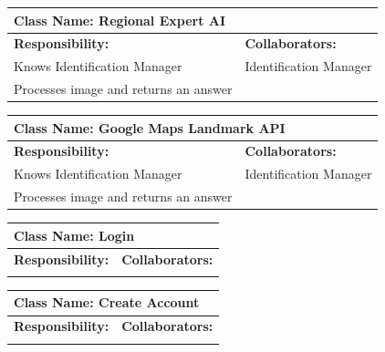 \documentclass[]{article}
\begin{document}
\begin{itemize}
	\begin{table}
		\centering
		\begin{tabular}{|p{8cm}|p{8cm}|}
		\hline 
		 \multicolumn{2}{|l|}{\textbf{Class Name:} Regional Expert AI} \\
		\hline
		\textbf{Responsibility:} & \textbf{Collaborators:} \\
		\hline
            Knows Identification Manager & Identification Manager \\
            Processes image and returns an answer
		\vspace{1cm} & \\
		\hline
		\end{tabular}
	\end{table}

	\begin{table}
		\centering
		\begin{tabular}{|p{8cm}|p{8cm}|}
		\hline 
		 \multicolumn{2}{|l|}{\textbf{Class Name:} Google Maps Landmark API} \\
		\hline
		\textbf{Responsibility:} & \textbf{Collaborators:} \\
		\hline
            Knows Identification Manager & Identification Manager \\
            Processes image and returns an answer
		\vspace{1cm} & \\
		\hline
		\end{tabular}
	\end{table}

	\begin{table}
		\centering
		\begin{tabular}{|p{5cm}|p{5cm}|}
		\hline 
		 \multicolumn{2}{|l|}{\textbf{Class Name:} Login} \\
		\hline
		\textbf{Responsibility:} & \textbf{Collaborators:} \\
		\hline
		\vspace{1in} & \\
		\hline
		\end{tabular}
	\end{table}

	\begin{table}
		\centering
		\begin{tabular}{|p{5cm}|p{5cm}|}
		\hline 
		 \multicolumn{2}{|l|}{\textbf{Class Name:} Create Account} \\
		\hline
		\textbf{Responsibility:} & \textbf{Collaborators:} \\
		\hline
		\vspace{1in} & \\
		\hline
		\end{tabular}
	\end{table}


\end{itemize}
\end{document}
